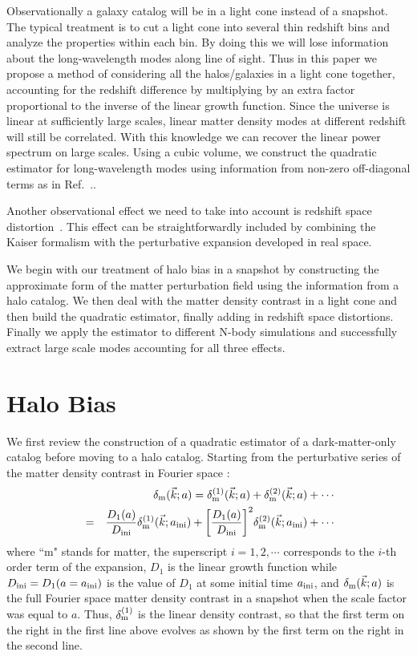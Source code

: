 \documentclass[prd,amsmath,amssymb,floatfix,superscriptaddress,nofootinbib,twocolumn]{revtex4-1}
\def\bea{\begin{eqnarray}}
\def\eea{\end{eqnarray}}
\newcommand{\ini}{\rm ini}
\newcommand{\vs}{\nonumber\\}
\newcommand{\vk}{\vec{k}}
\newcommand{\eql}[1]{\label{eq:#1}}
\begin{document}
Observationally a galaxy catalog will be in a light cone \cite{Carroll:1997gr} instead of a snapshot. The typical  treatment is to cut a light cone into several thin redshift bins \cite{Troxel:2017xyo} and analyze the properties within each bin. By doing this we will lose information about the long-wavelength modes along line of sight. Thus in this paper we propose a method of considering all the halos/galaxies in a light cone together, accounting for the redshift difference by multiplying by an extra factor proportional to the inverse of the linear growth function. Since the universe is linear at sufficiently large scales, linear matter density modes at different redshift will still be correlated. With this knowledge we can recover the linear power spectrum on large scales. Using a cubic volume, we construct the quadratic estimator for long-wavelength modes using information from non-zero off-diagonal terms as in Ref.~.\cite{Li:2020fir}.

Another observational effect we need to take into account is redshift space distortion~\cite{Kaiser:1987rsd}. This effect can be straightforwardly included by combining the Kaiser formalism with the perturbative expansion developed in real space.

We begin with our treatment of halo bias in a snapshot by constructing the approximate form of the matter perturbation field using the information from a halo catalog. We then deal with the matter density contrast in a light cone and then build the quadratic estimator, finally adding in redshift space distortions. Finally we apply the estimator to different N-body simulations and successfully extract large scale modes accounting for all three effects. 

\section{Halo Bias} \label{sec2}
\noindent We first review the construction of a quadratic estimator of a dark-matter-only catalog \cite{Li:2020fir} before moving to a halo catalog. Starting from the perturbative series of the matter density contrast in Fourier space \cite{Jain:1994sop}\cite{Bernardeau:2002rev}:
\bea
&&\delta_{\rm m}(\vk;a)=\delta^{(1)}_{\rm m}(\vk;a)+\delta^{(2)}_{\rm m}(\vk;a)+\cdots\vs
&=&\frac{D_1(a)}{D_{\rm ini}}\delta^{(1)}_{\rm m}(\vk;a_{\ini})+\bigg[\frac{D_1(a)}{D_{\rm ini}}\bigg]^2\delta^{(2)}_{\rm m}(\vk;a_{\ini})+\cdots \eql{tayl}
\eea 
where ``m" stands for matter, the superscript $i=1,2,\cdots$ corresponds to the $i$-th order term of the expansion, $D_1$ is the linear growth function while $D_{\ini} = D_1(a=a_{\ini})$ is the value of $D_1$ at some initial time $a_{\rm ini}$, and $\delta_{\rm m}(\vk;a)$ is the full Fourier space matter density contrast in a snapshot when the scale factor was equal to $a$. Thus, $\delta_{\rm m}^{(1)}$ is the linear density contrast, so that the first term on the right in the first line above evolves as shown by the first term on the right in the second line.
\end{document}
